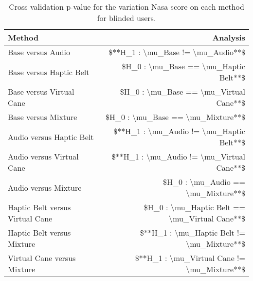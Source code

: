 
\begin{table}[!htb]
\centering
\caption{Cross validation p-value for the variation Nasa score on each method for blinded users.}
\label{tab:lsd_nasa_var}
\begin{tabular}{lr}
\toprule
                         Method &                                      Analysis \\
\midrule
              Base versus Audio &             \$**H\_1 : \textbackslash mu\_Base != \textbackslash mu\_Audio**\$ \\
        Base versus Haptic Belt &         \$H\_0 : \textbackslash mu\_Base == \textbackslash mu\_Haptic Belt**\$ \\
       Base versus Virtual Cane &        \$H\_0 : \textbackslash mu\_Base == \textbackslash mu\_Virtual Cane**\$ \\
            Base versus Mixture &             \$H\_0 : \textbackslash mu\_Base == \textbackslash mu\_Mixture**\$ \\
       Audio versus Haptic Belt &      \$**H\_1 : \textbackslash mu\_Audio != \textbackslash mu\_Haptic Belt**\$ \\
      Audio versus Virtual Cane &     \$**H\_1 : \textbackslash mu\_Audio != \textbackslash mu\_Virtual Cane**\$ \\
           Audio versus Mixture &            \$H\_0 : \textbackslash mu\_Audio == \textbackslash mu\_Mixture**\$ \\
Haptic Belt versus Virtual Cane & \$H\_0 : \textbackslash mu\_Haptic Belt == \textbackslash mu\_Virtual Cane**\$ \\
     Haptic Belt versus Mixture &    \$**H\_1 : \textbackslash mu\_Haptic Belt != \textbackslash mu\_Mixture**\$ \\
    Virtual Cane versus Mixture &   \$**H\_1 : \textbackslash mu\_Virtual Cane != \textbackslash mu\_Mixture**\$ \\
\bottomrule
\end{tabular}
\end{table}

